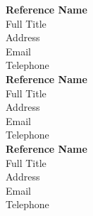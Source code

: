 \documentclass[a4paper,9pt]{extarticle}
\begin{document}
\noindent
\newline
\textbf{Reference Name} \\
Full Title \\
Address\\
Email \\
Telephone \\

\noindent
\textbf{Reference Name} \\
Full Title \\
Address\\
Email \\
Telephone \\

\noindent
\textbf{Reference Name} \\
Full Title \\
Address\\
Email \\
Telephone \\


\end{document}
